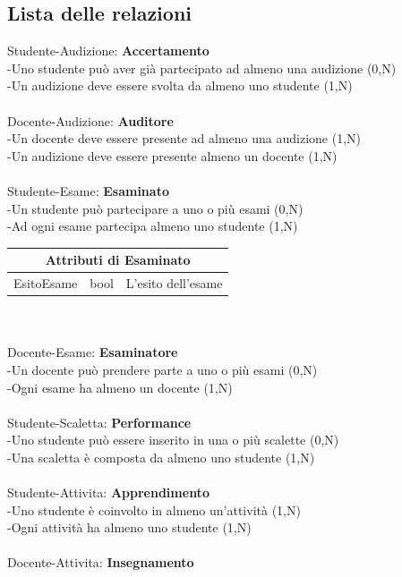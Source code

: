 \documentclass[11pt]{article}
\begin{document}
	\subsection{Lista delle relazioni}
		Studente-Audizione: \textbf{Accertamento}\\
		-Uno studente può aver già partecipato ad almeno una audizione (0,N)\\
		-Un audizione deve essere svolta da almeno uno studente (1,N)\\
		\\
		Docente-Audizione: \textbf{Auditore}\\
		-Un docente deve essere presente ad almeno una audizione (1,N)\\
		-Un audizione deve essere presente almeno un docente (1,N)\\
		\\
		Studente-Esame: \textbf{Esaminato}\\
		-Un studente può partecipare a uno o più esami (0,N)\\
		-Ad ogni esame partecipa almeno uno studente (1,N)\\
		\begin{tabular}{|c|c|c|}
			\hline
			\multicolumn{3}{|c|}{Attributi di \textbf{Esaminato}}\\
			\hline
			EsitoEsame & bool & L'esito dell'esame\\
			\hline
		\end{tabular}
		\\\\
		Docente-Esame: \textbf{Esaminatore}\\
		-Un docente può prendere parte a uno o più esami (0,N)\\
		-Ogni esame ha almeno un docente (1,N)\\
		\\
		Studente-Scaletta: \textbf{Performance}\\
		-Uno studente può essere inserito in una o più scalette (0,N)\\
		-Una scaletta è composta da almeno uno studente (1,N)\\
		\\
		Studente-Attivita: \textbf{Apprendimento}\\
		-Uno studente è coinvolto in almeno un'attività (1,N)\\
		-Ogni attività ha almeno uno studente (1,N)\\
		\\
		Docente-Attivita: \textbf{Insegnamento}\\
\end{document}
